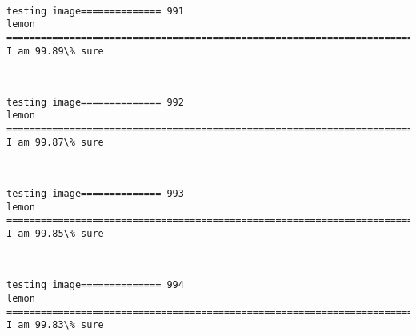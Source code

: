 \documentclass[11pt]{article}
\begin{document}
    \begin{center}
    \end{center}
    { \hspace*{\fill} \\}
    
    \begin{Verbatim}[commandchars=\\\{\}]
testing image============== 991
lemon
============================================================================
I am 99.89\% sure

    \end{Verbatim}

    \begin{center}
    \end{center}
    { \hspace*{\fill} \\}
    
    \begin{Verbatim}[commandchars=\\\{\}]
testing image============== 992
lemon
============================================================================
I am 99.87\% sure

    \end{Verbatim}

    \begin{center}
    \end{center}
    { \hspace*{\fill} \\}
    
    \begin{Verbatim}[commandchars=\\\{\}]
testing image============== 993
lemon
============================================================================
I am 99.85\% sure

    \end{Verbatim}

    \begin{center}
    \end{center}
    { \hspace*{\fill} \\}
    
    \begin{Verbatim}[commandchars=\\\{\}]
testing image============== 994
lemon
============================================================================
I am 99.83\% sure

    \end{Verbatim}
\end{document}
